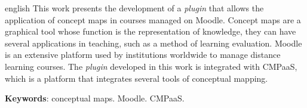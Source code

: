 \documentclass[
	12pt,				%
	openright,			%
	oneside,			%
	a4paper,			%
	english,			%
	french,				%
	spanish,			%
	brazil				%
	]{abntex2}
\begin{document}
\begin{resumo}[Abstract]
  \begin{otherlanguage*}{english}
    This work presents the development of a \textit{plugin}  that allows the application of concept
    maps in courses managed on Moodle. Concept maps are a graphical tool whose function
    is the representation of knowledge, they can have several applications in teaching, such as
    a method of learning evaluation. Moodle is an extensive platform used by institutions
    worldwide to manage distance learning courses. The \textit{plugin}  developed in this work is
    integrated with CMPaaS, which is a platform that integrates several tools of conceptual
    mapping.
 
    \vspace{\onelineskip}
 
    \noindent 
    \textbf{Keywords}: conceptual maps. Moodle. CMPaaS.
  \end{otherlanguage*}
\end{resumo}


\listoffigures*
\cleardoublepage




\tableofcontents*
\cleardoublepage



\textual
\end{document}
